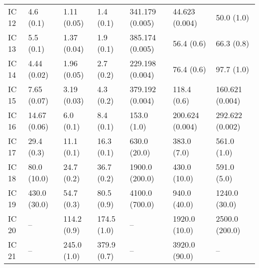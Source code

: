 \begin{tabular}{lllllll}
IC 12 &         4.6 (0.1) &        1.11 (0.05) &             1.4 (0.1) &         341.179 (0.005) &           44.623 (0.004) &                  50.0 (1.0) \\
IC 13 &         5.5 (0.1) &        1.37 (0.04) &             1.9 (0.1) &         385.174 (0.005) &               56.4 (0.6) &                  66.3 (0.8) \\
IC 14 &       4.44 (0.02) &        1.96 (0.05) &             2.7 (0.2) &         229.198 (0.004) &               76.4 (0.6) &                  97.7 (1.0) \\
IC 15 &       7.65 (0.07) &        3.19 (0.03) &             4.3 (0.2) &         379.192 (0.004) &              118.4 (0.6) &             160.621 (0.004) \\
IC 16 &      14.67 (0.06) &          6.0 (0.1) &             8.4 (0.1) &             153.0 (1.0) &          200.624 (0.004) &             292.622 (0.002) \\
IC 17 &        29.4 (0.3) &         11.1 (0.1) &            16.3 (0.1) &            630.0 (20.0) &              383.0 (7.0) &                 561.0 (1.0) \\
IC 18 &       80.0 (10.0) &         24.7 (0.2) &            36.7 (0.2) &          1900.0 (200.0) &             430.0 (10.0) &                 591.0 (5.0) \\
IC 19 &      430.0 (30.0) &         54.7 (0.3) &            80.5 (0.9) &          4100.0 (700.0) &             940.0 (40.0) &               1240.0 (30.0) \\
IC 20 &                -- &        114.2 (0.9) &           174.5 (1.0) &                      -- &            1920.0 (10.0) &              2500.0 (200.0) \\
IC 21 &                -- &        245.0 (1.0) &           379.9 (0.7) &                      -- &            3920.0 (90.0) &                          -- \\
\bottomrule
\end{tabular}
